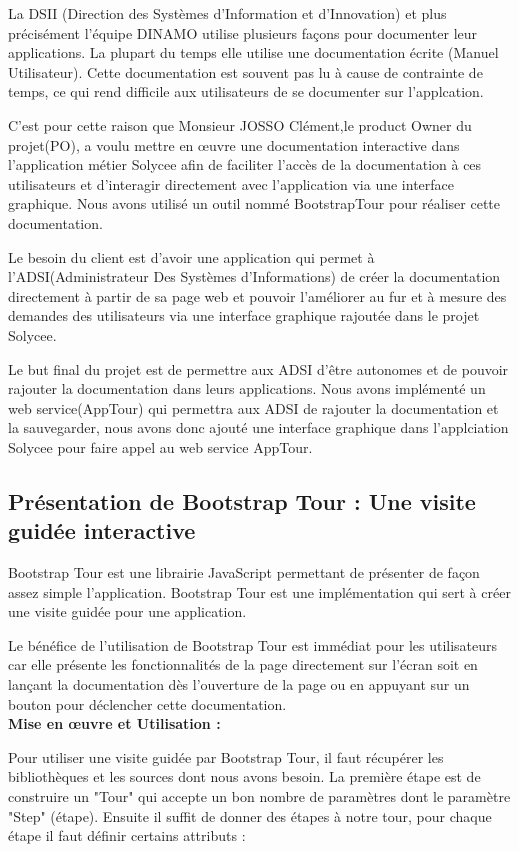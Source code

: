 \documentclass[12pt]{article}
\begin{document}
La DSII (Direction des Systèmes d'Information et d'Innovation) et plus précisément l'équipe DINAMO utilise plusieurs façons pour documenter leur applications. La plupart du temps elle utilise une documentation écrite (Manuel Utilisateur). Cette documentation est souvent pas lu à cause de contrainte de temps, ce qui rend difficile aux utilisateurs de se documenter sur l'applcation.


C'est pour cette raison que Monsieur JOSSO Clément,le product Owner du projet(PO), a voulu mettre en œuvre une documentation interactive dans l'application métier Solycee afin de faciliter l’accès de la documentation à ces utilisateurs et d'interagir directement avec l'application via une interface graphique. Nous avons utilisé un outil nommé BootstrapTour pour réaliser cette documentation. 

Le besoin du client est d'avoir une application qui permet à l'ADSI(Administrateur Des Systèmes d'Informations) de créer la documentation directement à partir de sa page web et pouvoir l'améliorer au fur et à mesure des demandes des utilisateurs via une interface graphique rajoutée dans le projet Solycee. 


Le but final du projet est de permettre aux ADSI d'être autonomes et de pouvoir rajouter la documentation dans leurs applications. Nous avons implémenté un web service(AppTour) qui permettra aux ADSI de rajouter la documentation et la sauvegarder, nous avons donc ajouté une interface graphique dans l'applciation Solycee pour faire appel au web service AppTour.
 
\subsection{Présentation de Bootstrap Tour : Une visite guidée interactive}
 
Bootstrap Tour est une librairie JavaScript permettant de présenter de façon assez simple l’application. Bootstrap Tour est une implémentation qui sert à créer une visite guidée pour une application.

Le bénéfice de l'utilisation de Bootstrap Tour est immédiat pour les utilisateurs car elle présente les fonctionnalités de la page directement sur l'écran soit en lançant la documentation  dès l'ouverture de la page ou en appuyant sur un bouton pour déclencher cette documentation.\\
\textbf{Mise en œuvre et  Utilisation :}

Pour utiliser une visite guidée par Bootstrap Tour, il faut récupérer les bibliothèques et les sources dont nous avons besoin. La première étape est de construire un "Tour" qui accepte un bon nombre de paramètres dont le paramètre "Step" (étape). Ensuite il suffit de donner des étapes à notre tour, pour chaque étape il faut définir certains attributs : 
\end{document}
